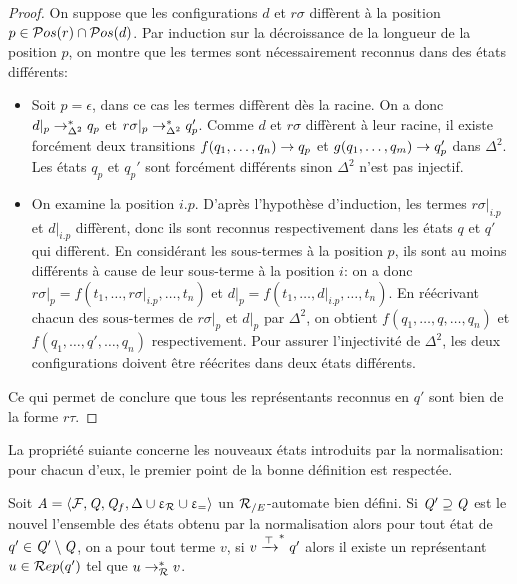 \begin{proof}
  On suppose que les configurations $d$ et $r\sigma$ diffèrent à la position $p \in \mathcal{ P}os(r) \cap \mathcal{ P}os(d)$.
  Par induction sur la décroissance de la longueur de la position $p$, 
  on montre que les termes sont nécessairement reconnus dans des états différents:

  \begin{itemize}
  \item Soit $p = \epsilon$, dans ce cas les termes diffèrent dès la racine.
    On a donc $d|_p \rightarrow^*_{\Delta^2} q_p$ et $r\sigma|_p \rightarrow^*_{\Delta^2} q'_p$. Comme $d$ et $r\sigma$ diffèrent à leur racine,
    il existe forcément deux transitions $f(q_1, \dots,q_n) \rightarrow q_p$ et $g(q_1, \dots,q_m) \rightarrow q_p'$ dans $\Delta^2$. %
    Les états $q_p$ et $q_p'$ sont forcément différents sinon $\Delta^2$ n'est pas injectif. 
  \item On examine la position $i.p$. D'après l'hypothèse d'induction, les termes $r\sigma|_{i.p}$ et $d|_{i.p}$ diffèrent, donc ils 
    sont reconnus respectivement dans les états $q$ et $q'$ qui diffèrent. En considérant les sous-termes à la position $p$,
    ils sont au moins différents à cause de leur sous-terme à la position $i$: on a donc $r\sigma|_p = f(t_1, \dots, r\sigma|_{i.p},\dots,t_n)$ et $d|_p = f(t_1, \dots, d|_{i.p},\dots,t_n)$.
    En réécrivant chacun des sous-termes de $r\sigma|_p$ et $d|_p$ par $\Delta^2$, on obtient $f(q_1, \dots, q, \dots, q_n)$ et $f(q_1, \dots, q', \dots, q_n)$ respectivement.
    Pour assurer l'injectivité de $\Delta^2$, les deux configurations doivent être réécrites dans deux états différents.
  \end{itemize}
  Ce qui permet de conclure que tous les représentants reconnus en $q'$ sont bien de la forme $r\tau$.
\end{proof}


La propriété suiante concerne les nouveaux états introduits par la normalisation: pour chacun d'eux,
le premier point de la bonne définition est respectée.
\begin{property}
  \label{prop:norm_well_def}
  Soit $\mathit A = \langle \mathcal{F}, \mathit Q, \mathit Q_f, \Delta \cup \upvarepsilon_{\mathcal R} \cup \upvarepsilon_{=}\rangle$ un ${\mathcal R_{/E}}$-automate bien défini.
  Si $\mathit Q' \supseteq \mathit Q$ est le nouvel l'ensemble des états obtenu par la normalisation alors pour tout état de $q'\in \mathit Q'\setminus\mathit Q$,
  on a pour tout terme $v$, si $v \xrightarrow{\top}^* q'$ alors il existe un représentant $u \in \mathcal R ep(q')$ tel que 
  $u \rightarrow^*_\mathcal R v$.
\end{property}

